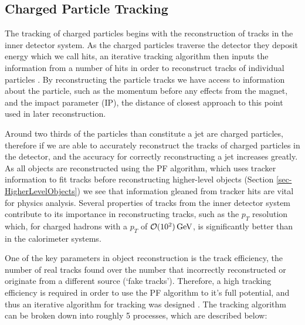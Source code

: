 \subsection{Charged Particle Tracking} \label{subsec-ChargedParticleTracking}

The tracking of charged particles begins with the reconstruction of tracks in the inner detector system. As the charged particles traverse the detector they deposit energy which we call hits, an iterative tracking algorithm then inputs the information from a number of hits in order to reconstruct tracks of individual particles \cite{1748-0221-9-10-P10009}. By reconstructing the particle tracks we have access to information about the particle, such as the momentum before any effects from the magnet, and the impact parameter (IP), the distance of closest approach to this point used in later reconstruction. 

Around two thirds of the particles than constitute a jet are charged particles, therefore if we are able to accurately reconstruct the tracks of charged particles in the detector, and the accuracy for correctly reconstructing a jet increases greatly. As all objects are reconstructed using the PF algorithm, which uses tracker information to fit tracks before reconstructing higher-level objects (Section \ref{sec-HigherLevelObjects}) we see that information gleaned from tracker hits are vital for physics analysis. Several properties of tracks from the inner detector system contribute to its importance in reconstructing tracks, such as the $p_T$ resolution which, for charged hadrons with a $p_T$ of $\mathcal{O}(10^2) \,\text{Ge\hspace{-.08em}V}$, is significantly better than in the calorimeter systems.

One of the key parameters in object reconstruction is the track efficiency, the number of real tracks found over the number that incorrectly reconstructed or originate from a different source (`fake tracks'). Therefore, a high tracking efficiency is required in order to use the PF algorithm to it's full potential, and thus an iterative algorithm for tracking was designed \cite{1748-0221-9-10-P10009}. The tracking algorithm can be broken down into roughly 5 processes, which are described below:

